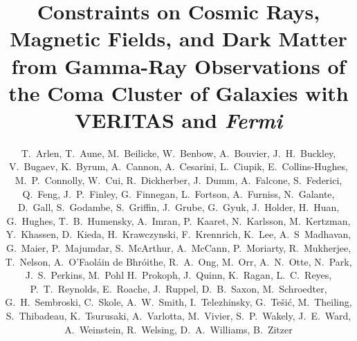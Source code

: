 \documentclass[12pt,manuscript]{aastex}
\def\Fermi{{\em Fermi}\xspace}
\begin{document}
\title{Constraints on Cosmic Rays, Magnetic Fields, and Dark Matter from Gamma-Ray Observations of the Coma Cluster of Galaxies with VERITAS and \Fermi}
\author{
T.~Arlen,
T.~Aune,
M.~Beilicke,
W.~Benbow,
A.~Bouvier,
J.~H.~Buckley,
V.~Bugaev,
K.~Byrum,
A.~Cannon,
A.~Cesarini,
L.~Ciupik,
E.~Collins-Hughes,
M.~P.~Connolly,
W.~Cui,
R.~Dickherber,
J.~Dumm,
A.~Falcone,
S.~Federici,
Q.~Feng,
J.~P.~Finley,
G.~Finnegan,
L.~Fortson,
A.~Furniss,
N.~Galante,
D.~Gall,
S.~Godambe,
S.~Griffin,
J.~Grube,
G.~Gyuk,
J.~Holder,
H.~Huan,
G.~Hughes,
T.~B.~Humensky,
A.~Imran,
P.~Kaaret,
N.~Karlsson,
M.~Kertzman,
Y.~Khassen,
D.~Kieda,
H.~Krawczynski,
F.~Krennrich,
K.~Lee,
A.~S~Madhavan,
G.~Maier,
P.~Majumdar,
S.~McArthur,
A.~McCann,
P.~Moriarty,
R.~Mukherjee,
T.~Nelson,
A.~O'Faol\'{a}in de Bhr\'{o}ithe,
R.~A.~Ong,
M.~Orr,
A.~N.~Otte,
N.~Park,
J.~S.~Perkins,
M.~Pohl
H.~Prokoph,
J.~Quinn,
K.~Ragan,
L.~C.~Reyes,
P.~T.~Reynolds,
E.~Roache,
J.~Ruppel,
D.~B.~Saxon,
M.~Schroedter,
G.~H.~Sembroski,
C.~Skole,
A.~W.~Smith,
I.~Telezhinsky,
G.~Te\v{s}i\'{c},
M.~Theiling,
S.~Thibadeau,
K.~Tsurusaki,
A.~Varlotta,
M.~Vivier,
S.~P.~Wakely,
J.~E.~Ward,
A.~Weinstein,
R.~Welsing,
D.~A.~Williams,
B.~Zitzer
}
\end{document}
